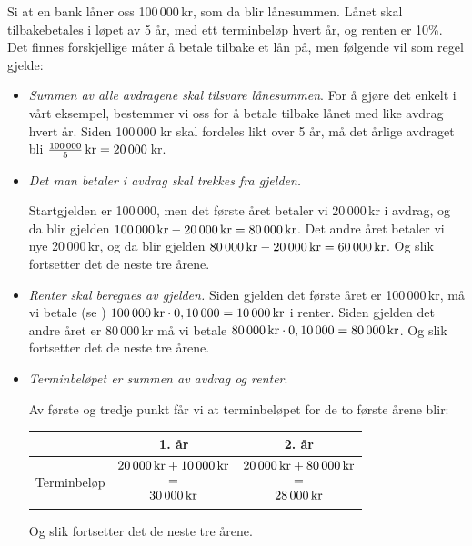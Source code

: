 Si at en bank låner  oss 100\,000\,kr, som da blir lånesummen. Lånet skal tilbakebetales i løpet av 5 år, med ett terminbeløp hvert år, og renten er 10\%. Det finnes forskjellige måter å betale tilbake et lån på, men følgende vil som regel gjelde:
\begin{itemize}
	\item \textsl{Summen av alle avdragene skal tilsvare lånesummen}.\os
	 For å gjøre det enkelt i vårt eksempel, bestemmer vi oss for å betale tilbake lånet med like avdrag hvert år. Siden 100\,000 kr skal fordeles likt over 5 år, må det årlige avdraget bli $ \frac{100\,000}{5}\,\textrm{kr}=20\,000 $\,kr.
	\item \textsl{Det man betaler i avdrag skal trekkes fra gjelden.}\os
	
	Startgjelden er 100\,000, men det første året betaler vi 20\,000\,kr i avdrag, og da blir gjelden $100\,000\,\textrm{kr}-20\,000\,\textrm{kr} =80\,000\,\textrm{kr} $. Det andre året betaler vi nye 20\,000\,kr, og da blir gjelden $ 80\,000\,\textrm{kr}-20\,000\,\textrm{kr} =60\,000\,\textrm{kr}  $. Og slik fortsetter det de neste tre årene.
	\item \textsl{Renter skal beregnes av gjelden.}\os 
	Siden gjelden det første året er 100\,000\,kr, må vi betale (se ) ${ 100\,000\,\textrm{kr}\cdot0,10\,000=10\,000\,\textrm{kr} } $ i renter. Siden gjelden det andre året er 80\,000\,kr må vi betale ${ 80\,000\,\textrm{kr}\cdot0,10\,000=80\,000\,\textrm{kr} } $.  Og slik fortsetter det de neste tre årene.
	
	\item \textsl{Terminbeløpet er summen av avdrag og renter}.\os
	
	Av første og tredje punkt får vi at terminbeløpet for de to første årene blir:\os
	\centering
	\begin{tabular}{c| c |c}
		 & 1. år & 2. år \\ \hline
		Terminbeløp 
			& $\begin{matrix}
			20\,000\,\textrm{kr} +10\,000\,\textrm{kr}\\
			= \\
			30\,000\,\textrm{kr}
			\end{matrix} $  
				& $\begin{matrix}
					20\,000\,\textrm{kr} +80\,000\,\textrm{kr}\\
					= \\
					28\,000\,\textrm{kr}
					\end{matrix} $ 
	\end{tabular}\os
\raggedright 
Og slik fortsetter det de neste tre årene.
\end{itemize}\vsk
